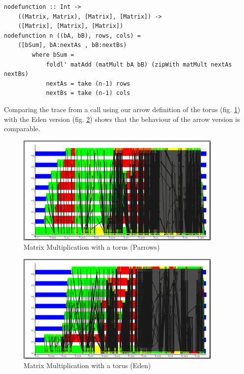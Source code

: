 \begin{lstlisting}[frame=htrbl]
nodefunction :: Int ->
	((Matrix, Matrix), [Matrix], [Matrix]) ->
	([Matrix], [Matrix], [Matrix])
nodefunction n ((bA, bB), rows, cols) =
	([bSum], bA:nextAs , bB:nextBs)
		where bSum =
			foldl' matAdd (matMult bA bB) (zipWith matMult nextAs nextBs)
			nextAs = take (n-1) rows
			nextBs = take (n-1) cols
\end{lstlisting}
Comparing the trace from a call using our arrow definition of the torus (fig. \ref{fig:torus_parrows_trace}) with the Eden version (fig. \ref{fig:torus_eden_trace}) shows that the behaviour of the arrow version is comparable.
\begin{figure}[ht]
	\centering
	\includegraphics[width=0.9\textwidth]{images/torus_matrix_parrows_scale}
	\caption[Matrix Multiplication with a torus (Parrows)]{Matrix Multiplication with a torus (Parrows)}
	\label{fig:torus_parrows_trace}
\end{figure}

\begin{figure}[ht]
	\centering
	\includegraphics[width=0.9\textwidth]{images/torus_matrix_eden_scale}
	\caption[Matrix Multiplication with a torus (Eden)]{Matrix Multiplication with a torus (Eden)}
	\label{fig:torus_eden_trace}
\end{figure}

